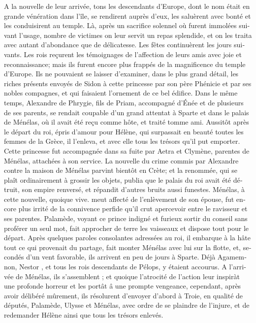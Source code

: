 \documentclass{article}
\begin{document}
\begin{pages}
\begin{Leftside}
\begin{french}
A la nouvelle de leur arrivée, tons les descendants d'Europe, dont le nom était en grande vénération dans l'île, se rendirent auprès d'eux, les saluèrent avec bonté et les conduisirent au temple. Là, après un sacrifice solennel où furent immolées suivant l'usage, nombre de victimes on leur servit un repas splendide, et on les traita avec autant d'abondance que de délicatesse. Les fêtes continuèrent les jours suivants. Les rois reçurent les témoignages de l'affection de leurs amis avec joie et reconnaissance; mais ils furent encore plus frappés de la magnificence du temple d'Europe. Ils ne pouvaient se laisser d'examiner, dans le plus grand détail, les riches présents envoyés de Sidon à cette princesse par son père Phénicie et par ses nobles compagnes, et qui faisaient l'ornement de ce bel édifice.
 \pend
 \pstart
Dans le même temps, Alexandre de Phrygie, fils de Priam, accompagné d'Énée et de plusieurs de ses parents, se rendait coupable d'un grand attentat à Sparte et dans le palais de Ménélas, où il avait été reçu comme hôte, et traité tomme ami. Aussitôt après le départ du roi, épris d'amour pour Hélène, qui surpassait en beauté toutes les femmes de la Grèce, il l'enleva, et avec elle tous les trésors qu'il put emporter. Cette princesse fut accompagnée dans sa fuite par Aetra et Clymène, parentes de Ménélas, attachées à son service. La nouvelle du crime commis par Alexandre contre la maison de Ménélas parvint bientôt en Crète; et la renommée, qui se plaît ordinairement à grossir les objets, publia que le palais du roi avait été détruit, son empire renversé, et répandit d'autres bruits aussi funestes.
 \pend
 \pstart
Ménélas, à cette nouvelle, quoique vive. meut affecté de l'enlèvement de son épouse, fut encore plus irrité de la connivence perfide qu'il crut apercevoir entre le ravisseur et ses parentes. Palamède, voyant ce prince indigné et furieux sortir du conseil sans proférer un seul mot, fait approcher de terre les vaisseaux et dispose tout pour le départ. Après quelques paroles consolantes adressées au roi, il embarque à la hâte tout ce qui provenait du partage, fait monter Ménélas avec lui sur la flotte, et, secondés d'un vent favorable, ils arrivent en peu de jours à Sparte. Déjà Agamemnon, Nestor , et tous les rois descendants de Pélops, y étaient accourus. A l'arrivée de Ménélas, ils s'assemblent ; et quoique l'atrocité de l'action leur inspiràt une profonde horreur et les portât â une prompte vengeance, cependant, après avoir délibéré mûrement, ils résolurent d'envoyer d'abord à Troie, en qualité de députés, Palamède, Ulysse et Ménélas, avec ordre de se plaindre de l'injure, et de redemander Hélène ainsi que tous les trésors enlevés.
\pend
\endnumbering
\end{french}
\end{Leftside}


\end{pages}
\end{document}
